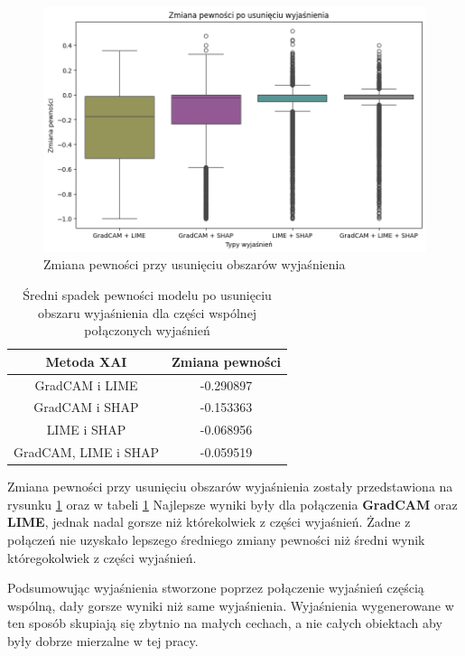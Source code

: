 \begin{figure}[h]
	\centering\includegraphics[width=.9\textwidth]{img/combine_confidence_no_exp_and}
	\caption{Zmiana pewności przy usunięciu obszarów wyjaśnienia}  \label{rys:combineandconfidenceandno}
\end{figure}
\begin{table}
	\centering
	\begin{tabular}{|c|c|}
		\hline
		\textbf{Metoda XAI}  & Zmiana pewności \\
		\hline
		GradCAM i LIME       & -0.290897       \\
		\hline
		GradCAM i SHAP       & -0.153363       \\
		\hline
		LIME i SHAP          & -0.068956       \\
		\hline
		GradCAM, LIME i SHAP & -0.059519       \\
		\hline
	\end{tabular}
	\caption{Średni spadek pewności modelu po usunięciu obszaru wyjaśnienia dla części wspólnej połączonych wyjaśnień}
	\label{tab:combineandconfidenceandno}
\end{table}
Zmiana pewności przy usunięciu obszarów wyjaśnienia zostały przedstawiona na rysunku \ref{rys:combineandconfidenceandno} oraz w tabeli \ref{tab:combineandconfidenceandno}
Najlepsze wyniki były dla połączenia \textbf{GradCAM} oraz \textbf{LIME}, jednak nadal gorsze niż którekolwiek z części wyjaśnień.
Żadne z połączeń nie uzyskało lepszego średniego zmiany pewności niż średni wynik któregokolwiek z części wyjaśnień.

\vspace{1cm}
Podsumowując wyjaśnienia stworzone poprzez połączenie wyjaśnień częścią wspólną, dały gorsze wyniki niż same wyjaśnienia.
Wyjaśnienia wygenerowane w ten sposób skupiają się zbytnio na małych cechach, a nie całych obiektach aby były dobrze mierzalne w tej pracy.

